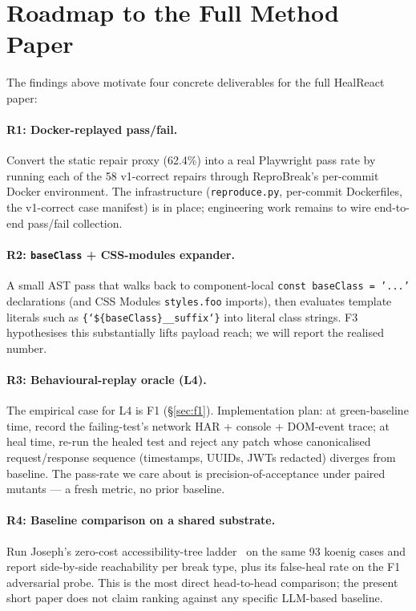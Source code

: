 \section{Roadmap to the Full Method Paper}
\label{sec:roadmap}

The findings above motivate four concrete deliverables for the full HealReact paper:

\paragraph{R1: Docker-replayed pass/fail.}
Convert the static repair proxy (62.4\%) into a real Playwright pass rate by running each of the 58 v1-correct repairs through ReproBreak's per-commit Docker environment. The infrastructure (\texttt{reproduce.py}, per-commit Dockerfiles, the v1-correct case manifest) is in place; engineering work remains to wire end-to-end pass/fail collection.

\paragraph{R2: \texttt{baseClass} + CSS-modules expander.}
A small AST pass that walks back to component-local \texttt{const baseClass = '...'} declarations (and CSS Modules \texttt{styles.foo} imports), then evaluates template literals such as \texttt{\{`\$\{baseClass\}\_\_suffix`\}} into literal class strings. F3 hypothesises this substantially lifts payload reach; we will report the realised number.

\paragraph{R3: Behavioural-replay oracle (L4).}
The empirical case for L4 is F1 (\S\ref{sec:f1}). Implementation plan: at green-baseline time, record the failing-test's network HAR + console + DOM-event trace; at heal time, re-run the healed test and reject any patch whose canonicalised request/response sequence (timestamps, UUIDs, JWTs redacted) diverges from baseline. The pass-rate we care about is precision-of-acceptance under paired mutants --- a fresh metric, no prior baseline.

\paragraph{R4: Baseline comparison on a shared substrate.}
Run Joseph's zero-cost accessibility-tree ladder~\cite{joseph2026zerocost} on the same 93 koenig cases and report side-by-side reachability per break type, plus its false-heal rate on the F1 adversarial probe. This is the most direct head-to-head comparison; the present short paper does not claim ranking against any specific LLM-based baseline.

